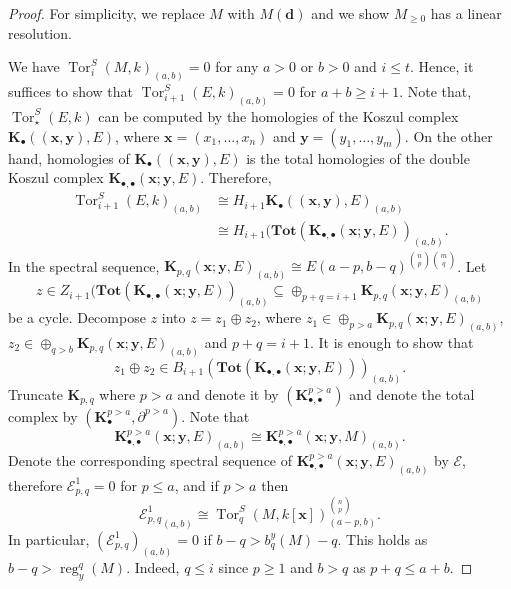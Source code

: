 \documentclass[11pt]{amsart}
\DeclareMathOperator{\reg}{reg}
\DeclareMathOperator{\tor}{Tor}
\DeclareMathOperator{\Tor}{Tor}
\theoremstyle{definition}
\begin{document}
\begin{proof}
For simplicity, we replace $M$ with $M(\textbf{d})$ and we show $M_{\geq 0}$ has a linear resolution.

We have $\tor_i^S(M,k)_{(a,b)}=0$ for any $a>0$ or $b> 0$ and $i\leq t$. Hence, it suffices to show that  $\tor_{i+1}^S(E,k)_{(a,b)} =0 $ for $a+b\geq i+1$. Note that, $\Tor^S_{\star}(E,k)$ can be computed by the homologies of the Koszul complex $\textbf{K}_{\bullet}((\textbf{x},\textbf{y}),E )$, where $\textbf{x}= (x_1,\dots,x_n)$ and $\textbf{y}= (y_1,\dots, y_m)$. On the other hand, homologies of $\textbf{K}_{\bullet}((\textbf{x},\textbf{y}),E )$ is the total homologies of the double Koszul complex $\textbf{K}_{\bullet,\bullet}(\textbf{x};\textbf{y},E )$. Therefore,
\begin{align*}
\tor_{i+1}^S(E,k)_{(a,b)}&\cong H_{i+1}\textbf{K}_{\bullet}((\textbf{x},\textbf{y}),E )_{(a,b)}\\
&\cong H_{i+1}(\textbf{Tot}(\textbf{K}_{\bullet,\bullet}(\textbf{x};\textbf{y},E))_{(a,b)}.
\end{align*}
 In the spectral sequence, $\textbf{K}_{p,q}(\textbf{x};\textbf{y},E)_{(a,b)}\cong E(a-p,b-q)^{\binom{n}{p}\binom{m}{q}}$. Let 
 $$
 z\in Z_{i+1}(\textbf{Tot}(\textbf{K}_{\bullet,\bullet}(\textbf{x};\textbf{y},E))_{(a,b)}\subseteq  \oplus_{p+q=i+1}\textbf{K}_{p,q}(\textbf{x};\textbf{y},E)_{(a,b)}
 $$
  be a cycle. Decompose $z$ into  $z=z_1\oplus z_2$, where $ z_1\in \oplus_{
 p>a} \textbf{K}_{p,q}(\textbf{x};\textbf{y},E)_{(a,b)}$, $ z_2\in \oplus_{
 q>b} \textbf{K}_{p,q}(\textbf{x};\textbf{y},E)_{(a,b)}$ and $p+q=i+1$.
It is enough to show  that
$$
 z_1\oplus z_2 \in B_{i+1}(\textbf{Tot}(\textbf{K}_{\bullet,\bullet}(\textbf{x};\textbf{y},E)))_{(a,b)}.
 $$
Truncate $\textbf{K}_{p,q}$ where $p>a$ and denote it by $(\textbf{K}_{\bullet,\bullet}^{p>a})$ and denote the total complex by $(\textbf{K}^{p>a}_{\bullet}, \partial^{p>a})$. Note that
$$
\textbf{K}_{\bullet,\bullet}^{p>a}(\textbf{x};\textbf{y},E)_{(a,b)}\cong \textbf{K}_{\bullet,\bullet}^{p>a}(\textbf{x};\textbf{y},M)_{(a,b)}.
$$
Denote  the corresponding spectral sequence of $\textbf{K}_{\bullet,\bullet}^{p>a}(\textbf{x};\textbf{y},E)_{(a,b)}$ by $\mathcal{E}$, therefore
$ \mathcal{E}^1_{p,q}= 0$ for $p\leq a$, and if $p>a$ then 
$$
{\mathcal{E}^1_{p,q}}_{(a,b)}\cong \tor_q^S(M, k[\textbf{x}])_{(a-p,b)}^{\binom{n}{p}}.
$$
In particular, $(\mathcal{E}^1_{p,q})_{(a,b)}=0$ if  $b-q> b^y_q(M)-q$. This holds as $b-q>\reg^q_y(M)$. Indeed, $q\leq i$ since $p\geq 1$ and $b>q$ as $p+q\leq a+b$.


\end{proof}
\end{document}
